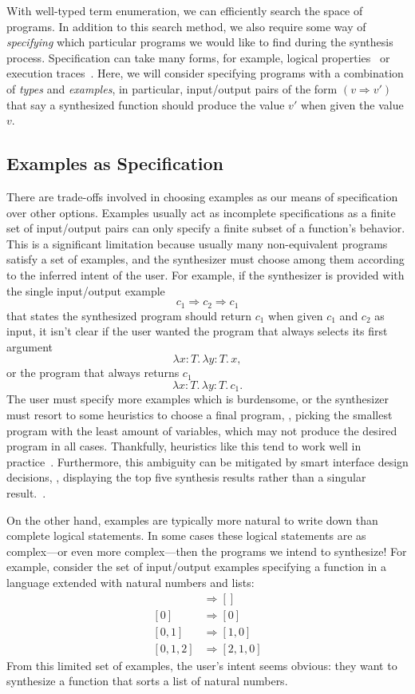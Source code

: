 With well-typed term enumeration, we can efficiently search the space of \stlc{} programs.
In addition to this search method, we also require some way of \emph{specifying} which particular programs we would like to find during the synthesis process.
Specification can take many forms, for example, logical properties~ or execution traces~.
Here, we will consider specifying programs with a combination of \emph{types} and \emph{examples}, in particular, input/output pairs of the form $(v ⇒ v')$ that say a synthesized function should produce the value $v'$ when given the value $v$.

\subsection{Examples as Specification}
\label{subsec:examples-as-specification}

There are trade-offs involved in choosing examples as our means of specification over other options.
Examples usually act as incomplete specifications as a finite set of input/output pairs can only specify a finite subset of a function's behavior.
This is a significant limitation because usually many non-equivalent programs satisfy a set of examples, and the synthesizer must choose among them according to the inferred intent of the user.
For example, if the synthesizer is provided with the single input/output example
\[
  c_1 ⇒ c_2 ⇒ c_1
\]
that states the synthesized program should return $c_1$ when given $c_1$ and $c_2$ as input, it isn't clear if the user wanted the program that always selects its first argument
\[
  λx{:}T.\,λy{:}T.\,x,
\]
or the program that always returns $c_1$
\[
  λx{:}T.\,λy{:}T.\,c_1.
\]
The user must specify more examples which is burdensome, or the synthesizer must resort to some heuristics to choose a final program, \eg, picking the smallest program with the least amount of variables, which may not produce the desired program in all cases.
Thankfully, heuristics like this tend to work well in practice~.
Furthermore, this ambiguity can be mitigated by smart interface design decisions, \eg, displaying the top five synthesis results rather than a singular result.~.

On the other hand, examples are typically more natural to write down than complete logical statements.
In some cases these logical statements are as complex---or even more complex---then the programs we intend to synthesize!
For example, consider the set of input/output examples specifying a function in a language extended with natural numbers and lists:
\begin{align*}
  []  &⇒ [] \\
  [0] &⇒ [0] \\
  [0, 1] &⇒ [1, 0] \\
  [0, 1, 2] &⇒ [2, 1, 0]
\end{align*}
From this limited set of examples, the user's intent seems obvious: they want to synthesize a function that sorts a list of natural numbers.

